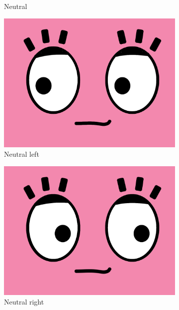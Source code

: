 \documentclass[12pt]{article}
\begin{document}
\begin{figure}[!htbp]
\begin{subfigure}[b]{0.23\textwidth}
    \caption{Neutral}
    \label{neutral}
    \end{subfigure}
    \begin{subfigure}[b]{0.23\textwidth}
    \centering
    \includegraphics[width=\textwidth]{3.png}
    \caption{Neutral left}
    \label{neutralleft}
    \end{subfigure}
    \begin{subfigure}[b]{0.23\textwidth}
    \centering
    \includegraphics[width=\textwidth]{6.png}
    \caption{Neutral right}
    \label{neutralright}
    \end{subfigure}\\~\\
    \begin{subfigure}[b]{0.23\textwidth}

\end{subfigure}
\end{figure}
\end{document}

